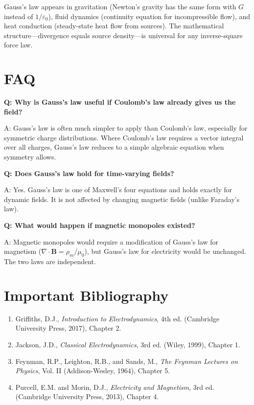 Gauss's law appears in gravitation (Newton's gravity has the same form with $G$ instead of $1/\varepsilon_0$), fluid dynamics (continuity equation for incompressible flow), and heat conduction (steady-state heat flow from sources). The mathematical structure---divergence equals source density---is universal for any inverse-square force law.

\section*{FAQ}

\textbf{Q: Why is Gauss's law useful if Coulomb's law already gives us the field?}

A: Gauss's law is often much simpler to apply than Coulomb's law, especially for symmetric charge distributions. Where Coulomb's law requires a vector integral over all charges, Gauss's law reduces to a simple algebraic equation when symmetry allows.

\textbf{Q: Does Gauss's law hold for time-varying fields?}

A: Yes. Gauss's law is one of Maxwell's four equations and holds exactly for dynamic fields. It is not affected by changing magnetic fields (unlike Faraday's law).

\textbf{Q: What would happen if magnetic monopoles existed?}

A: Magnetic monopoles would require a modification of Gauss's law for magnetism ($\nabla \cdot \mathbf{B} = \rho_m/\mu_0$), but Gauss's law for electricity would be unchanged. The two laws are independent.

\section*{Important Bibliography}

\begin{enumerate}
\item Griffiths, D.J., \textit{Introduction to Electrodynamics}, 4th ed. (Cambridge University Press, 2017), Chapter 2.
\item Jackson, J.D., \textit{Classical Electrodynamics}, 3rd ed. (Wiley, 1999), Chapter 1.
\item Feynman, R.P., Leighton, R.B., and Sands, M., \textit{The Feynman Lectures on Physics}, Vol. II (Addison-Wesley, 1964), Chapter 5.
\item Purcell, E.M. and Morin, D.J., \textit{Electricity and Magnetism}, 3rd ed. (Cambridge University Press, 2013), Chapter 4.
\end{enumerate}
